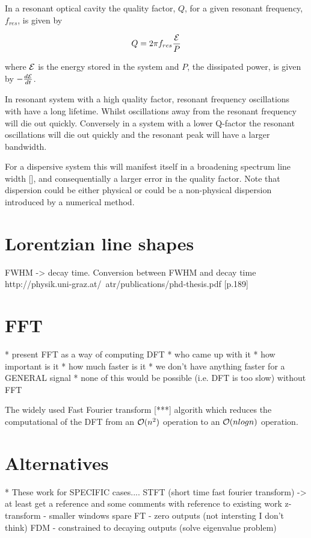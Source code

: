 In a resonant optical cavity the quality factor, $Q$, for a given resonant
frequency, $f_{res}$, is given by

$$
Q = 2 \pi f_{res} \frac{\mathcal{E}}{P}
$$

where $\mathcal{E}$ is the energy stored in the system and $P$, the dissipated
power, is given by $-\frac{d \mathcal{E}}{dt}$.

In resonant system with a high quality factor, resonant frequency oscillations
with have a long lifetime. Whilst oscillations away from the resonant frequency
will die out quickly. Conversely in a system with a lower Q-factor the resonant
oscillations will die out quickly and the resonant peak will have a larger
bandwidth. 

For a dispersive system this will manifest itself in a broadening spectrum line width [], and consequentially a larger error in the quality factor. Note that
dispersion could be either physical or could be a non-physical dispersion
introduced by a numerical method.



\section{Lorentzian line shapes}
FWHM -> decay time. Conversion between FWHM and decay time
http://physik.uni-graz.at/~atr/publications/phd-thesis.pdf [p.189]


\section{FFT}
* present FFT as a way of computing DFT * who came up with it *
how important is it
* how much faster is it
* we don't have anything faster for a GENERAL signal
* none of this would be possible (i.e. DFT is too slow) without FFT

The widely used Fast Fourier transform [***] algorith which reduces the computational of the DFT from an $\mathcal{O}(n^2)$ operation to an $\mathcal{O}(n log n)$ operation. 

\section{Alternatives} * These work for SPECIFIC cases.... STFT (short time fast
fourier transform) -> at least get a reference and some comments with reference to existing work 
z-transform - smaller windows spare FT - zero outputs (not intersting I don't think)
FDM - constrained to decaying outputs (solve eigenvalue problem)




